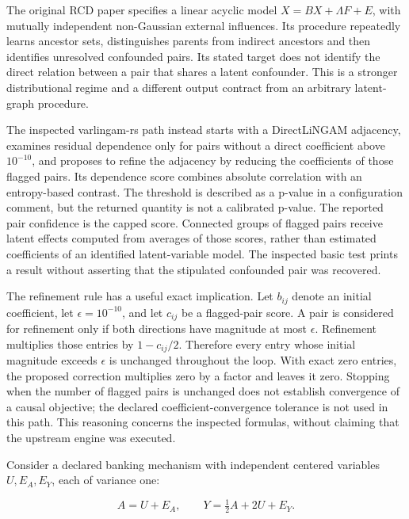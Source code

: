 The original RCD paper specifies a linear acyclic model
\(X=BX+\Lambda F+E\), with mutually independent non-Gaussian external
influences. Its procedure repeatedly learns ancestor sets, distinguishes
parents from indirect ancestors and then identifies unresolved
confounded pairs. Its stated target does not identify the direct
relation between a pair that shares a latent confounder. This is a
stronger distributional regime and a different output contract from an
arbitrary latent-graph procedure. \citep{exec14_olatent_rcd_paper}

The inspected varlingam-rs path instead starts with a DirectLiNGAM
adjacency, examines residual dependence only for pairs without a direct
coefficient above \(10^{-10}\), and proposes to refine the adjacency by
reducing the coefficients of those flagged pairs. Its dependence score
combines absolute correlation with an entropy-based contrast. The
threshold is described as a p-value in a configuration comment, but the
returned quantity is not a calibrated p-value. The reported pair
confidence is the capped score. Connected groups of flagged pairs
receive latent effects computed from averages of those scores, rather
than estimated coefficients of an identified latent-variable model. The
inspected basic test prints a result without asserting that the
stipulated confounded pair was recovered.
\citep{exec14_olatent_varlingam}

The refinement rule has a useful exact implication. Let \(b_{ij}\)
denote an initial coefficient, let \(\epsilon=10^{-10}\), and let
\(c_{ij}\) be a flagged-pair score. A pair is considered for refinement
only if both directions have magnitude at most \(\epsilon\). Refinement
multiplies those entries by \(1-c_{ij}/2\). Therefore every entry whose
initial magnitude exceeds \(\epsilon\) is unchanged throughout the loop.
With exact zero entries, the proposed correction multiplies zero by a
factor and leaves it zero. Stopping when the number of flagged pairs is
unchanged does not establish convergence of a causal objective; the
declared coefficient-convergence tolerance is not used in this path.
This reasoning concerns the inspected formulas, without claiming that
the upstream engine was executed.
\citep{exec14_olatent_varlingam,exec14_olatent_oracle}

Consider a declared banking mechanism with independent centered
variables \(U,E_A,E_Y\), each of variance one:

\[
A=U+E_A,\qquad Y=\tfrac12 A+2U+E_Y.
\]

